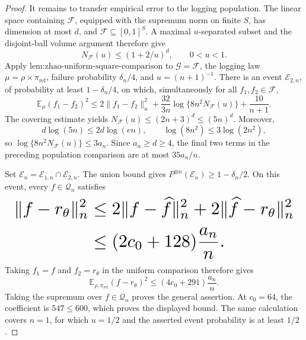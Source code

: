 \documentclass{article}
\begin{document}
\begin{proof}
It remains to transfer empirical error to the logging population. The linear space containing \(\mathcal F\), equipped with the supremum norm on finite \(S\), has dimension at most \(d\), and \(\mathcal F\subseteq[0,1]^S\). A maximal \(u\)-separated subset and the disjoint-ball volume argument therefore give
\[
N_{\mathcal F}(u)\le(1+2/u)^d,
\qquad 0<u<1.
\]
Apply \(\text{lem:zhao-uniform-square-comparison}\) to \(\mathcal G=\mathcal F\), the logging law \(\mu=\rho\times\pi_{\mathrm{ref}}\), failure probability \(\delta_n/4\), and \(u=(n+1)^{-1}\). There is an event \(\mathcal E_{2,n}\), of probability at least \(1-\delta_n/4\), on which, simultaneously for all \(f_1,f_2\in\mathcal F\),
\[
\mathbb E_\mu(f_1-f_2)^2
\le2\|f_1-f_2\|_n^2
+\frac{32}{3n}\log\{8n^2N_{\mathcal F}(u)\}
+\frac{10}{n+1}.
\]
The covering estimate yields \(N_{\mathcal F}(u)\le(2n+3)^d\le(5n)^d\). Moreover,
\[
d\log(5n)\le2d\log(en),
\qquad
\log(8n^2)\le3\log(2n^2),
\]
so \(\log\{8n^2N_{\mathcal F}(u)\}\le3a_n\). Since \(a_n\ge d\ge4\), the final two terms in the preceding population comparison are at most \(35a_n/n\).

Set \(\mathcal E_n=\mathcal E_{1,n}\cap\mathcal E_{2,n}\). The union bound gives \(P^{\otimes n}(\mathcal E_n)\ge1-\delta_n/2\). On this event, every \(f\in\mathcal Q_n\) satisfies
\[
\makebox[\linewidth][c]{\resizebox{0.98\linewidth}{!}{\(\displaystyle \begin{aligned}
\|f-r_\theta\|_n^2
&\le2\|f-\widehat f\|_n^2+2\|\widehat f-r_\theta\|_n^2\\
&\le(2c_0+128)\frac{a_n}{n}.
\end{aligned}\)}}
\]
Taking \(f_1=f\) and \(f_2=r_\theta\) in the uniform comparison therefore gives
\[
\mathbb E_{\rho,\pi_{\mathrm{ref}}}(f-r_\theta)^2
\le(4c_0+291)\frac{a_n}{n}.
\]
Taking the supremum over \(f\in\mathcal Q_n\) proves the general assertion. At \(c_0=64\), the coefficient is \(547\le600\), which proves the displayed bound. The same calculation covers \(n=1\), for which \(u=1/2\) and the asserted event probability is at least \(1/2\).
\end{proof}
\end{document}
